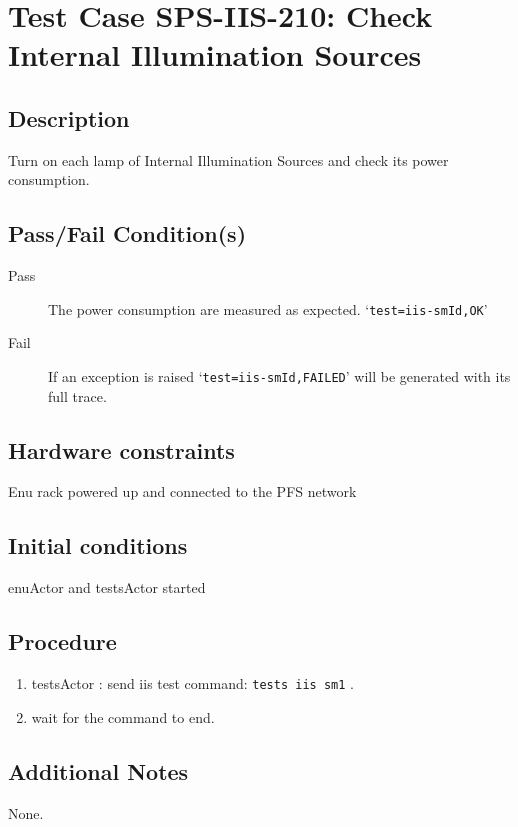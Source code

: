 \section{Test Case SPS-IIS-210: Check Internal Illumination Sources}

\subsection{Description}

Turn on each lamp of Internal Illumination Sources and check its power consumption.
\subsection{Pass/Fail Condition(s)}

\begin{description}
\item [Pass] The power consumption are measured as expected. `\texttt{test=iis-smId,OK}'
\item [Fail] If an exception is raised `\texttt{test=iis-smId,FAILED}' will be generated with its full trace.
\end{description}

\subsection{Hardware constraints}

Enu rack powered up and connected to the PFS network

\subsection{Initial conditions}
enuActor and testsActor started

\subsection{Procedure}

\begin{enumerate}
    \item testsActor : send iis test command: \texttt{tests iis sm1} .
    \item wait for the command to end.
\end{enumerate}



\subsection{Additional Notes}

None.